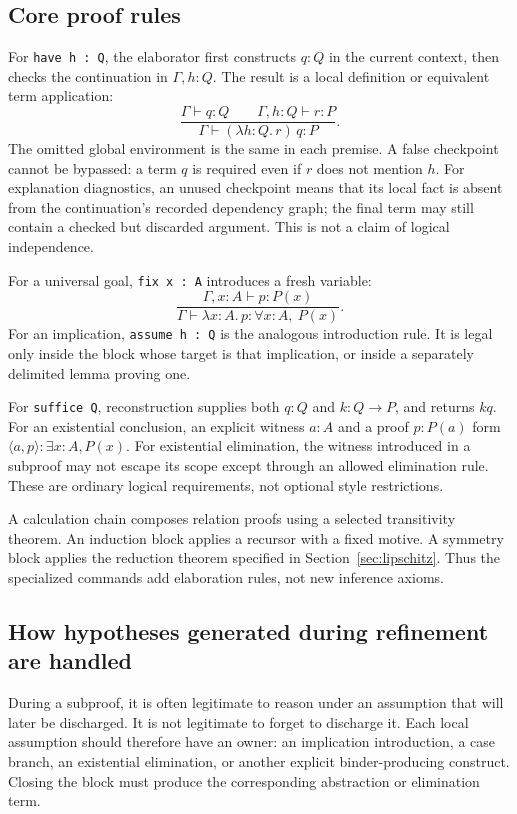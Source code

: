 \documentclass[11pt,a4paper]{article}
\newcommand{\code}[1]{\texttt{\small #1}}
\theoremstyle{definition}
\theoremstyle{remark}
\begin{document}
\subsection{Core proof rules}
For \code{have h : Q}, the elaborator first constructs $q:Q$ in the current context, then checks the continuation in $\Gamma,h:Q$. The result is a local definition or equivalent term application:
\[
 \frac{\Gamma\vdash q:Q\qquad\Gamma,h:Q\vdash r:P}
      {\Gamma\vdash (\lambda h:Q.\,r)\,q:P}.
\]
The omitted global environment is the same in each premise. A false checkpoint cannot be bypassed: a term $q$ is required even if $r$ does not mention $h$. For explanation diagnostics, an unused checkpoint means that its local fact is absent from the continuation's recorded dependency graph; the final term may still contain a checked but discarded argument. This is not a claim of logical independence.

For a universal goal, \code{fix x : A} introduces a fresh variable:
\[
 \frac{\Gamma,x:A\vdash p:P(x)}
      {\Gamma\vdash\lambda x:A.\,p:\forall x:A,\ P(x)}.
\]
For an implication, \code{assume h : Q} is the analogous introduction rule. It is legal only inside the block whose target is that implication, or inside a separately delimited lemma proving one.

For \code{suffice Q}, reconstruction supplies both $q:Q$ and $k:Q\to P$, and returns $kq$. For an existential conclusion, an explicit witness $a:A$ and a proof $p:P(a)$ form $\langle a,p\rangle:\exists x:A,P(x)$. For existential elimination, the witness introduced in a subproof may not escape its scope except through an allowed elimination rule. These are ordinary logical requirements, not optional style restrictions.

A calculation chain composes relation proofs using a selected transitivity theorem. An induction block applies a recursor with a fixed motive. A symmetry block applies the reduction theorem specified in Section~\ref{sec:lipschitz}. Thus the specialized commands add elaboration rules, not new inference axioms.

\subsection{How hypotheses generated during refinement are handled}
During a subproof, it is often legitimate to reason under an assumption that will later be discharged. It is not legitimate to forget to discharge it. Each local assumption should therefore have an owner: an implication introduction, a case branch, an existential elimination, or another explicit binder-producing construct. Closing the block must produce the corresponding abstraction or elimination term.
\end{document}

